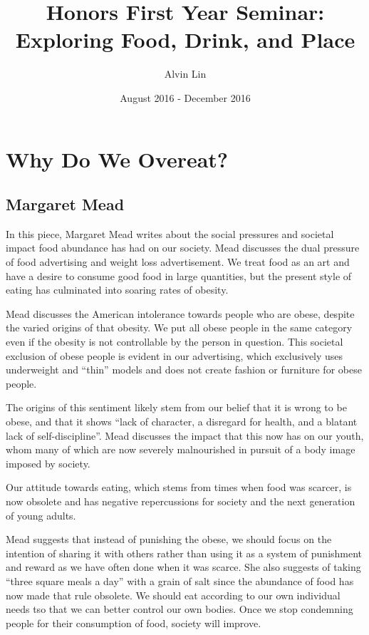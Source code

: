 \documentclass{article}
\title{Honors First Year Seminar: Exploring Food, Drink, and Place}
\author{Alvin Lin}
\date{August 2016 - December 2016}
\begin{document}
\maketitle

\section*{Why Do We Overeat?}
\subsection*{Margaret Mead}
In this piece, Margaret Mead writes about the social pressures and societal impact food abundance has had on our society. Mead discusses the dual pressure of food advertising and weight loss advertisement. We treat food as an art and have a desire to consume good food in large quantities, but the present style of eating has culminated into soaring rates of obesity. \par
Mead discusses the American intolerance towards people who are obese, despite the varied origins of that obesity. We put all obese people in the same category even if the obesity is not controllable by the person in question. This societal exclusion of obese people is evident in our advertising, which exclusively uses underweight and ``thin'' models and does not create fashion or furniture for obese people. \par
The origins of this sentiment likely stem from our belief that it is wrong to be obese, and that it shows ``lack of character, a disregard for health, and a blatant lack of self-discipline''. Mead discusses the impact that this now has on our youth, whom many of which are now severely malnourished in pursuit of a body image imposed by society. \par
Our attitude towards eating, which stems from times when food was scarcer, is now obsolete and has negative repercussions for society and the next generation of young adults. \par
Mead suggests that instead of punishing the obese, we should focus on the intention of sharing it with others rather than using it as a system of punishment and reward as we have often done when it was scarce. She also suggests of taking ``three square meals a day'' with a grain of salt since the abundance of food has now made that rule obsolete. We should eat according to our own individual needs tso that we can better control our own bodies. Once we stop condemning people for their consumption of food, society will improve.
\end{document}
